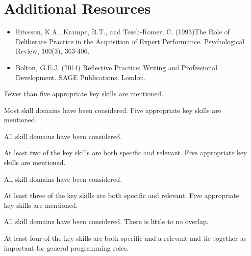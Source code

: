 \documentclass{../../fal_assignment}
\begin{document}
\section*{Additional Resources}

\begin{itemize}
    \item Ericsson, K.A., Krampe, R.T., and Tesch-Romer, C. (1993)The Role of Deliberate Practice in the Acquisition of Expert Performance. Psychological Review, 100(3), 363-406.
    \item Bolton, G.E.J. (2014) Reflective Practice: Writing and Professional Development. SAGE Publications: London.
\end{itemize}

\rubricyearthree

\begin{markingrubric}
%
%
        \grade \fail  	Fewer than five appropriate key skills are mentioned.
        \par 		Most skill domains have been considered.
        \grade 		Five appropriate key skills are mentioned.
        \par 		All skill domains have been considered.
        \par 		At least two of the key skills are both specific and relevant.
        \grade 		Five appropriate key skills are mentioned.
        \par 		All skill domains have been considered.
        \par 		At least three of the key skills are both specific and relevant.
        \grade 		Five appropriate key skills are mentioned.
        \par 		All skill domains have been considered. There is little to no overlap.
        \par 		At least four of the key skills are both specific and a relevant and tie together as important for general programming roles.

\end{markingrubric}
\end{document}
